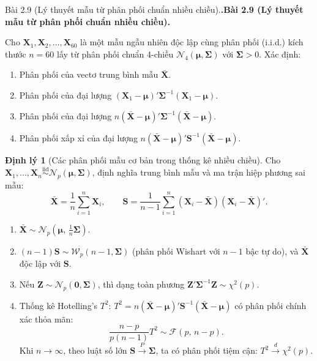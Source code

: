 \documentclass[11pt,a4paper]{article}
\makeatletter
\newcounter{prob}
\newenvironment{problem}[1][]{%
  \par\medskip\noindent
  \def\@tempa{#1}%
  \ifx\@tempa\@empty\refstepcounter{prob}\textbf{\theprob.}\else\textbf{#1}\fi
  \ \ignorespaces
}{\par}
\theoremstyle{definition}
\newtheorem{thm}{Định lý}
\makeatother
\begin{document}
\begin{problem}[Bài 2.9 (Lý thuyết mẫu từ phân phối chuẩn nhiều chiều).]
Cho $\mathbf{X}_1, \mathbf{X}_2, \dots, \mathbf{X}_{60}$ là một mẫu ngẫu nhiên độc lập cùng phân phối (i.i.d.) kích thước $n = 60$ lấy từ phân phối chuẩn 4-chiều $\mathcal{N}_4(\boldsymbol{\mu}, \boldsymbol{\Sigma})$ với $\boldsymbol{\Sigma} > 0$. Xác định:
\begin{enumerate}[label=\alph*)]
  \item Phân phối của vectơ trung bình mẫu $\bar{\mathbf{X}}$.
  \item Phân phối của đại lượng $(\mathbf{X}_1 - \boldsymbol{\mu})' \boldsymbol{\Sigma}^{-1} (\mathbf{X}_1 - \boldsymbol{\mu})$.
  \item Phân phối của đại lượng $n(\bar{\mathbf{X}} - \boldsymbol{\mu})' \boldsymbol{\Sigma}^{-1} (\bar{\mathbf{X}} - \boldsymbol{\mu})$.
  \item Phân phối xấp xỉ của đại lượng $n(\bar{\mathbf{X}} - \boldsymbol{\mu})' \mathbf{S}^{-1} (\bar{\mathbf{X}} - \boldsymbol{\mu})$.
\end{enumerate}
\end{problem}

\begin{thm}[Các phân phối mẫu cơ bản trong thống kê nhiều chiều]
Cho $\mathbf{X}_1, \dots, \mathbf{X}_n \stackrel{\text{iid}}{\sim} \mathcal{N}_p(\boldsymbol{\mu}, \boldsymbol{\Sigma})$, định nghĩa trung bình mẫu và ma trận hiệp phương sai mẫu:
\[
\bar{\mathbf{X}} = \frac{1}{n}\sum_{i=1}^n \mathbf{X}_i, \qquad \mathbf{S} = \frac{1}{n-1}\sum_{i=1}^n (\mathbf{X}_i - \bar{\mathbf{X}})(\mathbf{X}_i - \bar{\mathbf{X}})'.
\]
\begin{enumerate}
  \item $\bar{\mathbf{X}} \sim \mathcal{N}_p\left(\boldsymbol{\mu}, \, \frac{1}{n}\boldsymbol{\Sigma}\right)$.
  \item $(n-1)\mathbf{S} \sim \mathcal{W}_p(n-1, \boldsymbol{\Sigma})$ (phân phối Wishart với $n-1$ bậc tự do), và $\bar{\mathbf{X}}$ độc lập với $\mathbf{S}$.
  \item Nếu $\mathbf{Z} \sim \mathcal{N}_p(\mathbf{0}, \boldsymbol{\Sigma})$, thì dạng toàn phương $\mathbf{Z}'\boldsymbol{\Sigma}^{-1}\mathbf{Z} \sim \chi^2(p)$.
  \item Thống kê Hotelling's $T^2$: $T^2 = n(\bar{\mathbf{X}} - \boldsymbol{\mu})'\mathbf{S}^{-1}(\bar{\mathbf{X}} - \boldsymbol{\mu})$ có phân phối chính xác thỏa mãn:
  \[
  \frac{n-p}{p(n-1)} T^2 \sim \mathcal{F}(p, \, n-p).
  \]
  Khi $n \to \infty$, theo luật số lớn $\mathbf{S} \xrightarrow{P} \boldsymbol{\Sigma}$, ta có phân phối tiệm cận: $T^2 \xrightarrow{d} \chi^2(p)$.
\end{enumerate}
\end{thm}
\end{document}
